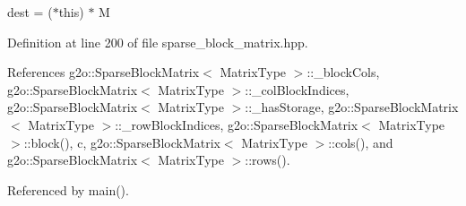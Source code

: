 dest = ($\ast$this) $\ast$ M 



Definition at line 200 of file sparse\+\_\+block\+\_\+matrix.\+hpp.



References g2o\+::\+Sparse\+Block\+Matrix$<$ Matrix\+Type $>$\+::\+\_\+block\+Cols, g2o\+::\+Sparse\+Block\+Matrix$<$ Matrix\+Type $>$\+::\+\_\+col\+Block\+Indices, g2o\+::\+Sparse\+Block\+Matrix$<$ Matrix\+Type $>$\+::\+\_\+has\+Storage, g2o\+::\+Sparse\+Block\+Matrix$<$ Matrix\+Type $>$\+::\+\_\+row\+Block\+Indices, g2o\+::\+Sparse\+Block\+Matrix$<$ Matrix\+Type $>$\+::block(), c, g2o\+::\+Sparse\+Block\+Matrix$<$ Matrix\+Type $>$\+::cols(), and g2o\+::\+Sparse\+Block\+Matrix$<$ Matrix\+Type $>$\+::rows().



Referenced by main().


